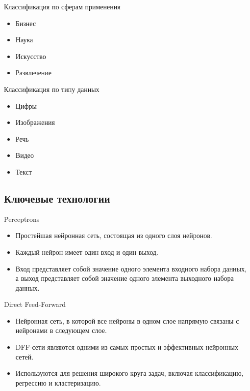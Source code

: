 \documentclass{beamer}
\begin{document}
\begin{frame}{Классификация по сферам применения}


\begin{itemize}
\item Бизнес
\item Наука
\item Искусство
\item Развлечение
\end{itemize}
\end{frame}

\begin{frame}{Классификация по типу данных}

\begin{itemize}
\item Цифры
\item Изображения
\item Речь
\item Видео
\item Текст
\end{itemize}
\end{frame}
\subsection{Ключевые технологии}

\begin{frame}{Perceptrons}


\begin{itemize}
\item Простейшая нейронная сеть, состоящая из одного слоя нейронов.
\item Каждый нейрон имеет один вход и один выход.
\item Вход представляет собой значение одного элемента входного набора данных, а выход представляет собой значение одного элемента выходного набора данных.
\end{itemize}
\end{frame}

\begin{frame}{Direct Feed-Forward}


\begin{itemize}
\item Нейронная сеть, в которой все нейроны в одном слое напрямую связаны с нейронами в следующем слое.
\item DFF-сети являются одними из самых простых и эффективных нейронных сетей.
\item Используются для решения широкого круга задач, включая классификацию, регрессию и кластеризацию.
\end{itemize}
\end{frame}
\end{document}
